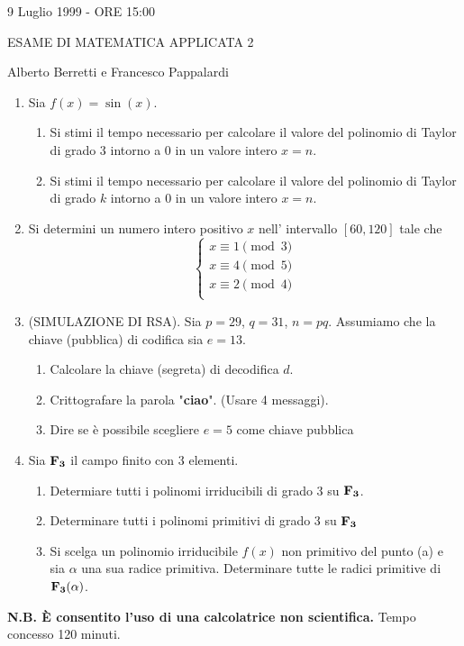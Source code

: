 \documentclass{article}
\begin{document}
\centerline{9 Luglio 1999 - ORE 15:00}
\centerline{ESAME DI MATEMATICA APPLICATA 2}
\centerline{Alberto Berretti e Francesco Pappalardi}\bigskip

\begin{enumerate}

\item Sia $f(x)=\sin(x)$.
\begin{enumerate}
\item Si stimi il tempo necessario per calcolare
il valore del polinomio di Taylor di grado 3 intorno a $0$ in
un valore intero $x=n$.
\item  Si stimi il tempo necessario per calcolare
il valore del polinomio di Taylor di grado $k$ intorno a $0$ in
un valore intero $x=n$.
\end{enumerate}

\item Si determini un numero intero positivo $x$ nell'
intervallo $[60, 120]$ tale che
$$\left\{\begin{array}{l}
x\equiv 1\pmod 3 \\
x\equiv 4 \pmod 5 \\
x\equiv 2 \pmod 4 \\
\end{array}\right.$$ \bigskip\bigskip

\item (SIMULAZIONE DI RSA). Sia $p=29$, $q=31$, $n=pq$. Assumiamo
che la chiave (pubblica) di codifica sia $e=13$.
\begin{enumerate}
\item Calcolare la chiave (segreta) di decodifica $d$.
\item Crittografare la parola "{\bf ciao}". (Usare 4 messaggi).
\item Dire se \`e possibile scegliere $e=5$ come
chiave pubblica
\end{enumerate} \bigskip\bigskip

\item Sia $\bf F_3$ il campo finito con 3 elementi.
\begin{enumerate}
\item Determiare tutti i polinomi irriducibili di grado 3 su
  $\bf F_3$.
\item Determinare tutti i polinomi primitivi di grado 3 su $\bf F_3$
\item Si scelga un polinomio irriducibile $f(x)$ non primitivo del
punto (a) e sia $\alpha$ una sua radice primitiva. Determinare
tutte le radici primitive di $\bf F_3(\alpha)$.
\end{enumerate} \bigskip\bigskip
\end{enumerate}

{\bf N.B. \`E consentito l'uso di una calcolatrice non scientifica.}
Tempo concesso 120 minuti.
\end{document}
